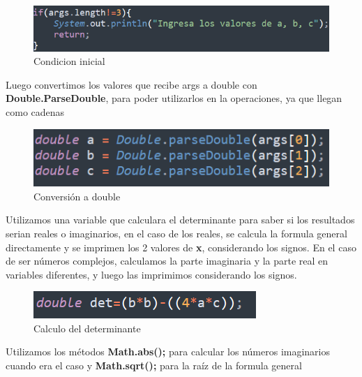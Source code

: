 \documentclass[letterpaper,12pt]{article}
\begin{document}
\begin{figure}[H]
    \centering
    \includegraphics[width=0.5\linewidth]{Imagenes/return.png}
    \caption*{Condicion inicial}
\end{figure}

Luego convertimos los valores que recibe args a double con \textbf{Double.ParseDouble}, para poder utilizarlos en la operaciones, ya que llegan como cadenas

\begin{figure}[H]
    \centering
    \includegraphics[width=0.5\linewidth]{Imagenes/double.png}
    \caption*{Conversión a double}
\end{figure}

Utilizamos una variable que calculara el determinante para saber si los resultados serian reales o imaginarios, en el caso de los reales, se calcula la formula general directamente y se imprimen los 2 valores de \textbf{x}, considerando los signos. En el caso de ser números complejos, calculamos la parte imaginaria y la parte real en variables diferentes, y luego las imprimimos considerando los signos. 

\begin{figure}[H]
    \centering
    \includegraphics[width=0.5\linewidth]{Imagenes/det.png}
    \caption*{Calculo del determinante}
\end{figure}

Utilizamos los métodos \textbf{Math.abs();} para calcular los números imaginarios cuando era el caso y \textbf{Math.sqrt();} para la raíz de la formula general
\end{document}
